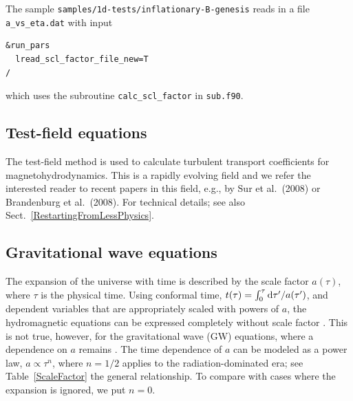 \documentclass[\mydriver,12pt,twoside,notitlepage,a4paper]{article}
\newcommand{\code}[1]{\texttt{#1}}
\newcommand{\dd}{{\rm d} {}}
\def\half{\textstyle{\frac{1}{2}}}
\begin{document}
The sample \code{samples/1d-tests/inflationary-B-genesis} reads in a file
\code{a_vs_eta.dat} with input
\begin{verbatim}
&run_pars
  lread_scl_factor_file_new=T
/
\end{verbatim}
which uses the subroutine \code{calc_scl_factor} in \code{sub.f90}.


\subsection{Test-field equations}

The test-field method is used to calculate turbulent transport coefficients
for magnetohydrodynamics.
This is a rapidly evolving field and we refer the interested reader to
recent papers in this field, e.g., by Sur et al.\ (2008) or
Brandenburg et al.\ (2008).
For technical details; see also Sect.~\ref{RestartingFromLessPhysics}.


\subsection{Gravitational wave equations}

\def\SX{S_\times}
\def\ST{S_+}
\def\hX{h_\times}
\def\hT{h_+}
\def\hX{h_\times}
\def\thT{\tilde{h}_+}
\def\thX{\tilde{h}_\times}
\def\dhT{\dot{h}_+}
\def\dhX{\dot{h}_\times}
\def\dthT{\dot{\tilde{h}}_+}
\def\dthX{\dot{\tilde{h}}_\times}
\def\hrms{h_{\rm rms}}
\def\dhrms{\dot{h}_{\rm rms}}
\def\kGW{k_{\rm GW}}
\def\Sh{S_{h}}
\def\Ah{A_{h}}
\def\Shdot{S_{\dot{h}}}
\def\Ahdot{A_{\dot{h}}}
\def\EEGW{{\cal E}_{\rm GW}}
\def\EGW{E_{\rm GW}}
\def\HGW{H_{\rm GW}}
\def\Imag{\mbox{\rm Im}}
\def\DD{\rm D}
\def\ii{\rm i}
\def\onethird{{\textstyle{1\over3}}}
\def\half{{\textstyle{1\over2}}}

The expansion of the universe with time is described by the scale
factor $a(\tau)$, where $\tau$ is the physical time.
Using conformal time, $t(\tau)=\int_0^\tau\dd\tau'/a(\tau')$, and
dependent variables that are appropriately scaled with powers of $a$,
the hydromagnetic equations can be expressed completely without scale
factor \cite{BEO96,Dur08}.
This is not true, however, for the gravitational wave (GW) equations,
where a dependence on $a$ remains \cite{Dur08}.
The time dependence of $a$ can be modeled as a power law,
$a\propto\tau^n$, where $n=1/2$ applies to the radiation-dominated era;
see Table~\ref{ScaleFactor} the general relationship.
To compare with cases where the expansion is ignored, we put $n=0$.
\end{document}
